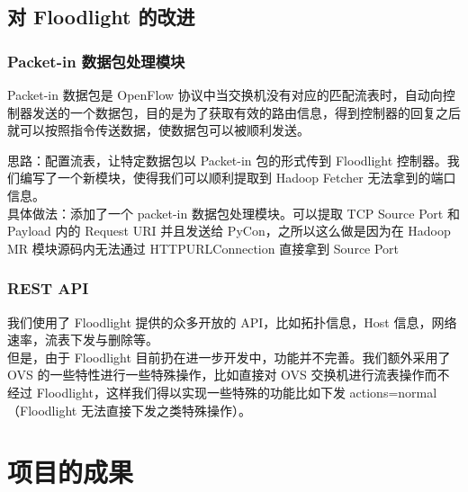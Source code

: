 \documentclass[a4paper, 11pt]{article}                                                   %
\begin{document}
\begin{CJK*}{UTF8}{song}
\subsection{对 Floodlight 的改进}

\subsubsection{Packet-in 数据包处理模块}

Packet-in 数据包是 OpenFlow 协议中当交换机没有对应的匹配流表时，自动向控制器发送的一个数据包，目的是为了获取有效的路由信息，得到控制器的回复之后就可以按照指令传送数据，使数据包可以被顺利发送。

思路：配置流表，让特定数据包以 Packet-in 包的形式传到 Floodlight 控制器。我们编写了一个新模块，使得我们可以顺利提取到 Hadoop Fetcher 无法拿到的端口信息。\\

具体做法：添加了一个 packet-in 数据包处理模块。可以提取 TCP Source Port 和 Payload 内的 Request URI 并且发送给 PyCon，之所以这么做是因为在 Hadoop MR 模块源码内无法通过 HTTPURLConnection 直接拿到 Source Port\\

\subsubsection{REST API}
我们使用了 Floodlight 提供的众多开放的 API，比如拓扑信息，Host 信息，网络速率，流表下发与删除等。\\
但是，由于 Floodlight 目前扔在进一步开发中，功能并不完善。我们额外采用了 OVS 的一些特性进行一些特殊操作，比如直接对 OVS 交换机进行流表操作而不经过 Floodlight，这样我们得以实现一些特殊的功能比如下发 actions=normal（Floodlight 无法直接下发之类特殊操作）。

\section{项目的成果}

\end{CJK*}
\end{document}

